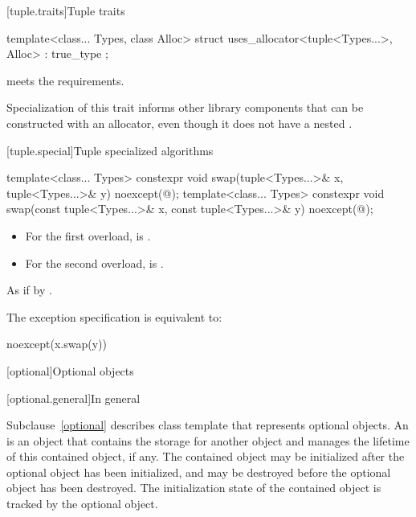 [tuple.traits]{Tuple traits}

%
\begin{itemdecl}
template<class... Types, class Alloc>
  struct uses_allocator<tuple<Types...>, Alloc> : true_type { };
\end{itemdecl}

\begin{itemdescr}
\pnum
\expects
{} meets
the  requirements.

\pnum
\begin{note}
Specialization of this trait informs other library components that
 can be constructed with an allocator, even though it does not have
a nested .
\end{note}
\end{itemdescr}

[tuple.special]{Tuple specialized algorithms}

%
\begin{itemdecl}
template<class... Types>
  constexpr void swap(tuple<Types...>& x, tuple<Types...>& y) noexcept(@\seebelow@);
template<class... Types>
  constexpr void swap(const tuple<Types...>& x, const tuple<Types...>& y) noexcept(@\seebelow@);
\end{itemdecl}

\begin{itemdescr}
\pnum
\constraints
\begin{itemize}
\item
For the first overload,
 is .
\item
For the second overload,
 is .
\end{itemize}

\pnum
\effects
As if by .

\pnum
\remarks
The exception specification is equivalent to:

\begin{codeblock}
noexcept(x.swap(y))
\end{codeblock}
\end{itemdescr}

[optional]{Optional objects}

[optional.general]{In general}

\pnum
Subclause~\ref{optional} describes class template  that represents
optional objects.
An  is an
object that contains the storage for another object and manages the lifetime of
this contained object, if any. The contained object may be initialized after
the optional object has been initialized, and may be destroyed before the
optional object has been destroyed. The initialization state of the contained
object is tracked by the optional object.

